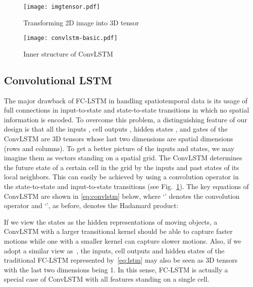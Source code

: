 \documentclass{article} \usepackage{amsmath}
\begin{document}
\begin{figure}[!tb]
    \begin{minipage}[tb]{0.35\textwidth}
        \begin{center}
        \texttt{[image: imgtensor.pdf]}
        \caption{Transforming 2D image into 3D tensor}
        \label{fig:img-to-tensor}
        \end{center}
    \end{minipage}
    \qquad
    \begin{minipage}[tb]{0.6\textwidth}
        \begin{center}
        \texttt{[image: convlstm-basic.pdf]}
        \caption{Inner structure of ConvLSTM}
        \label{fig:convlstm-structure}
        \end{center}
    \end{minipage}
    \vspace{-1em}
\end{figure}

\subsection{Convolutional LSTM}
The major drawback of FC-LSTM in handling spatiotemporal data is its usage of full connections in input-to-state and state-to-state transitions in which no spatial information is encoded. To overcome this problem, a distinguishing feature of our design is that all the inputs , cell outputs , hidden states , and gates  of the ConvLSTM are 3D tensors whose last two dimensions are spatial dimensions (rows and columns). To get a better picture of the inputs and states, we may imagine them as vectors standing on a spatial grid. The ConvLSTM determines the future state of a certain cell in the grid by the inputs and past states of its local neighbors. This can easily be achieved by using a convolution operator in the state-to-state and input-to-state transitions (see Fig.~\ref{fig:convlstm-structure}). The key equations of ConvLSTM are shown in \eqref{eq:convlstm} below, where `' denotes the convolution operator and `', as before, denotes the Hadamard product:

If we view the states as the hidden representations of moving objects, a ConvLSTM with a larger transitional kernel should be able to capture faster motions while one with a smaller kernel can capture slower motions. Also, if we adopt a similar view as~\cite{long2014fully}, the inputs, cell outputs and hidden states of the traditional FC-LSTM represented by~\eqref{eq:lstm} may also be seen as 3D tensors with the last two dimensions being 1. In this sense, FC-LSTM is actually a special case of ConvLSTM with all features standing on a single cell.
\end{document}
